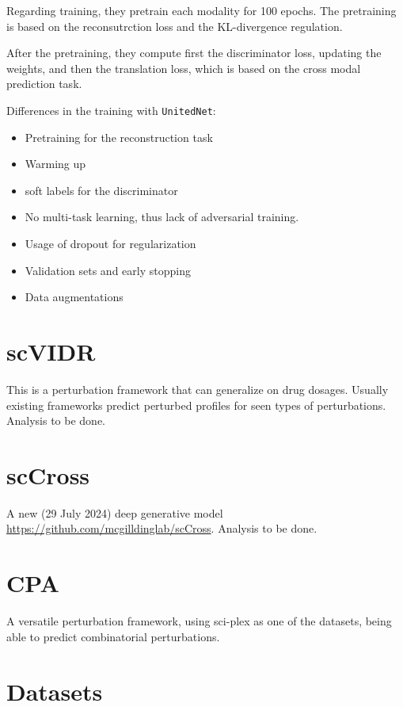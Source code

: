 \documentclass[12pt, a4paper]{article}
\begin{document}
Regarding training, they pretrain each modality for 100 epochs. The pretraining is based on the reconsutrction loss and the KL-divergence regulation. 

After the pretraining, they compute first the discriminator loss, updating the weights, and then the translation loss, which is based on the cross modal prediction task.

Differences in the training with \verb|UnitedNet|:

\begin{itemize}
  \itemsep -0.1em
  \item Pretraining for the reconstruction task
  \item Warming up
  \item soft labels for the discriminator
  \item No multi-task learning, thus lack of adversarial training.
  \item Usage of dropout for regularization
  \item Validation sets and early stopping
  \item Data augmentations
\end{itemize}

\section{scVIDR}

This is a perturbation framework that can generalize on drug dosages. Usually existing frameworks predict perturbed profiles for seen types of perturbations. Analysis to be done.

\section{scCross}

A new (29 July 2024) deep generative model \url{https://github.com/mcgilldinglab/scCross}. Analysis to be done.

\section{CPA}

A versatile perturbation framework, using sci-plex as one of the datasets, being able to predict combinatorial perturbations.

\clearpage

\section{Datasets}
\label{sec:datasets}
\end{document}
